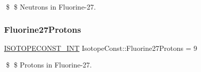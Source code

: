 \$ \$ Neutrons in Fluorine-\/27. \mbox{\label{group___isotope_const-_fluorine-_f27_ga87d3ab92cf3b5286baa13b09670a1849}} 
\subsubsection{\texorpdfstring{Fluorine27\+Protons}{Fluorine27Protons}}
{\footnotesize\ttfamily \mbox{\hyperlink{group___isotope_const-_macros_ga5f18360b3e99483a35c32d789e62621c}{I\+S\+O\+T\+O\+P\+E\+C\+O\+N\+S\+T\+\_\+\+I\+NT}} Isotope\+Const\+::\+Fluorine27\+Protons = 9}

\$ \$ Protons in Fluorine-\/27. 